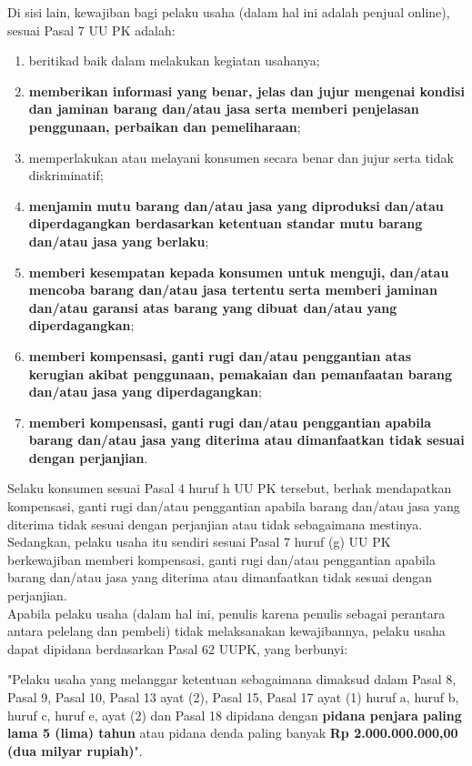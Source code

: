 \indent Di sisi lain, kewajiban bagi pelaku usaha (dalam hal ini adalah penjual online), sesuai Pasal 7 UU PK adalah:
\begin{enumerate}[label=\alph*.]
	\item beritikad baik dalam melakukan kegiatan usahanya;
	\item \textbf{memberikan informasi yang benar, jelas dan jujur mengenai kondisi dan jaminan barang dan/atau jasa serta memberi penjelasan penggunaan, perbaikan dan pemeliharaan};
	\item memperlakukan atau melayani konsumen secara benar dan jujur serta tidak diskriminatif;
	\item \textbf{menjamin mutu barang dan/atau jasa yang diproduksi dan/atau diperdagangkan berdasarkan ketentuan standar mutu barang dan/atau jasa yang berlaku};
	\item \textbf{memberi kesempatan kepada konsumen untuk menguji, dan/atau mencoba barang  dan/atau jasa tertentu serta memberi jaminan dan/atau garansi atas barang yang dibuat dan/atau yang diperdagangkan};
	\item \textbf{memberi kompensasi, ganti rugi dan/atau penggantian atas kerugian akibat penggunaan, pemakaian dan pemanfaatan barang dan/atau jasa yang diperdagangkan};
	\item \textbf{memberi kompensasi, ganti rugi dan/atau penggantian apabila barang dan/atau jasa yang diterima atau dimanfaatkan tidak sesuai dengan perjanjian}.
\end{enumerate}

\indent Selaku konsumen sesuai Pasal 4 huruf h UU PK tersebut, berhak mendapatkan kompensasi, ganti rugi dan/atau penggantian apabila barang dan/atau jasa yang diterima tidak sesuai dengan perjanjian atau tidak sebagaimana mestinya. Sedangkan, pelaku usaha itu sendiri sesuai Pasal 7 huruf (g) UU PK berkewajiban memberi kompensasi, ganti rugi dan/atau penggantian apabila barang dan/atau jasa yang diterima atau dimanfaatkan tidak sesuai dengan perjanjian.\\

\indent Apabila pelaku usaha (dalam hal ini, penulis karena penulis sebagai perantara antara pelelang dan pembeli) tidak melaksanakan kewajibannya, pelaku usaha dapat dipidana berdasarkan Pasal 62 UUPK, yang berbunyi:
\begin{displayquote}
	"Pelaku usaha yang melanggar ketentuan sebagaimana dimaksud dalam Pasal 8, Pasal 9, Pasal 10, Pasal 13 ayat (2), Pasal 15, Pasal 17 ayat (1) huruf a, huruf b, huruf c, huruf e, ayat (2) dan Pasal 18 dipidana dengan \textbf{pidana penjara paling lama 5 (lima) tahun} atau pidana denda paling banyak \textbf{Rp 2.000.000.000,00 (dua milyar rupiah)}".
\end{displayquote}

